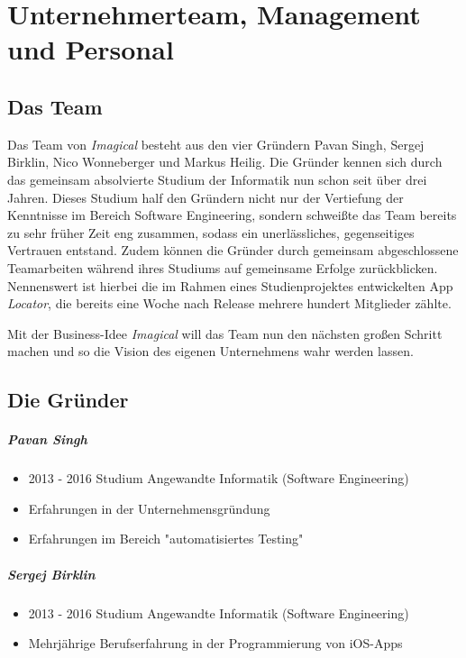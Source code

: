 \chapter{Unternehmerteam, Management und Personal}


\section{Das Team}

Das Team von \textit{Imagical} besteht aus den vier Gründern Pavan Singh, Sergej Birklin, Nico Wonneberger und Markus Heilig.
Die Gründer kennen sich durch das gemeinsam absolvierte Studium der Informatik nun schon seit über drei Jahren.
Dieses Studium half den Gründern nicht nur der Vertiefung der Kenntnisse im Bereich Software Engineering, sondern schweißte das Team bereits zu sehr früher Zeit eng zusammen, sodass ein unerlässliches, gegenseitiges Vertrauen entstand.
Zudem können die Gründer durch gemeinsam abgeschlossene Teamarbeiten während ihres Studiums auf gemeinsame Erfolge zurückblicken.
Nennenswert ist hierbei die im Rahmen eines Studienprojektes entwickelten App \textit{Locator}, die bereits eine Woche nach Release mehrere hundert Mitglieder zählte.

Mit der Business-Idee \textit{Imagical} will das Team nun den nächsten großen Schritt machen und so die Vision des eigenen Unternehmens wahr werden lassen.

\section{Die Gründer}

\paragraph{Pavan Singh}
\begin{itemize}
\item 2013 - 2016 Studium Angewandte Informatik (Software Engineering)
\item Erfahrungen in der Unternehmensgründung
\item Erfahrungen im Bereich "automatisiertes Testing"
\end{itemize}


\paragraph{Sergej Birklin}
\begin{itemize}
\item 2013 - 2016 Studium Angewandte Informatik (Software Engineering)
\item Mehrjährige Berufserfahrung in der Programmierung von iOS-Apps
\end{itemize}

